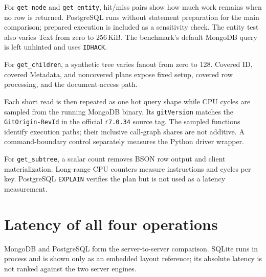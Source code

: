 \documentclass[10pt]{article}
\newcommand{\code}[1]{\texttt{#1}}
\begin{document}
For \code{get\_node} and \code{get\_entity}, hit/miss pairs show how much work
remains when no row is returned. PostgreSQL runs without statement preparation
for the main comparison; prepared execution is included as a sensitivity
check. The entity test also varies Text from zero to 256\,KiB. The benchmark's
default MongoDB query is left unhinted and uses \code{IDHACK}.

For \code{get\_children}, a synthetic tree varies fanout from zero to 128.
Covered ID, covered Metadata, and noncovered plans expose fixed setup, covered
row processing, and the document-access path.

Each short read is then repeated as one hot query shape while CPU cycles are
sampled from the running MongoDB binary. Its \code{gitVersion} matches the
\code{GitOrigin-RevId} in the official \code{r7.0.34} source tag. The sampled
functions identify execution paths; their inclusive call-graph shares are not
additive. A command-boundary control separately measures the Python driver
wrapper.

For \code{get\_subtree}, a scalar count removes BSON row output and client
materialization. Long-range CPU counters measure instructions and cycles per
key. PostgreSQL \code{EXPLAIN} verifies the plan but is not used as a latency
measurement.

\Needspace{0.43\textheight}
\section{Latency of all four operations}\label{sec:all-ops}

MongoDB and PostgreSQL form the server-to-server comparison. SQLite runs in
process and is shown only as an embedded layout reference; its absolute latency
is not ranked against the two server engines.
\end{document}
